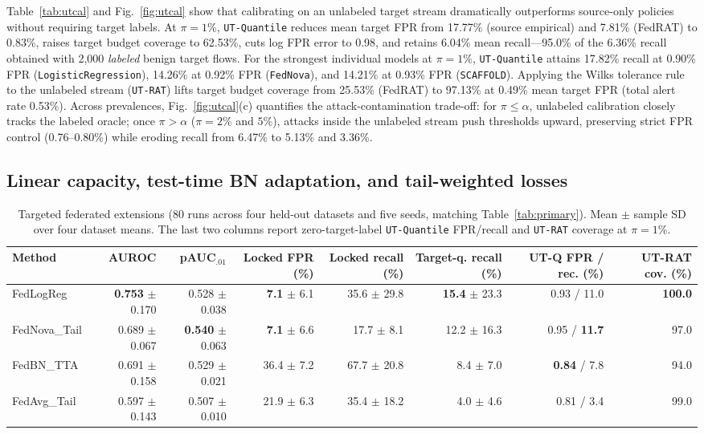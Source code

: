 \documentclass[journal,10pt]{IEEEtran}
\begin{document}
Table~\ref{tab:utcal} and Fig.~\ref{fig:utcal} show that calibrating on an unlabeled target stream dramatically outperforms source-only policies without requiring target labels. At $\pi=1\%$, \texttt{UT-Quantile} reduces mean target FPR from 17.77\% (source empirical) and 7.81\% (FedRAT) to 0.83\%, raises target budget coverage to 62.53\%, cuts log FPR error to 0.98, and retains 6.04\% mean recall---95.0\% of the 6.36\% recall obtained with 2,000 \emph{labeled} benign target flows. For the strongest individual models at $\pi=1\%$, \texttt{UT-Quantile} attains 17.82\% recall at 0.90\% FPR (\texttt{LogisticRegression}), 14.26\% at 0.92\% FPR (\texttt{FedNova}), and 14.21\% at 0.93\% FPR (\texttt{SCAFFOLD}). Applying the Wilks tolerance rule to the unlabeled stream (\texttt{UT-RAT}) lifts target budget coverage from 25.53\% (FedRAT) to 97.13\% at 0.49\% mean target FPR (total alert rate 0.53\%). Across prevalences, Fig.~\ref{fig:utcal}(c) quantifies the attack-contamination trade-off: for $\pi\le\alpha$, unlabeled calibration closely tracks the labeled oracle; once $\pi>\alpha$ ($\pi=2\%$ and $5\%$), attacks inside the unlabeled stream push thresholds upward, preserving strict FPR control (0.76--0.80\%) while eroding recall from 6.47\% to 5.13\% and 3.36\%.

\subsection{Linear capacity, test-time BN adaptation, and tail-weighted losses}
\begin{table}[t]\centering\footnotesize
\caption{Targeted federated extensions (80 runs across four held-out datasets and five seeds, matching Table~\ref{tab:primary}). Mean $\pm$ sample SD over four dataset means. The last two columns report zero-target-label \texttt{UT-Quantile} FPR/recall and \texttt{UT-RAT} coverage at $\pi=1\%$.}\label{tab:day2}
\setlength{\tabcolsep}{4pt}\begin{tabular}{lrrrrrrr}\toprule
Method & AUROC & pAUC$_{.01}$ & Locked FPR (\%) & Locked recall (\%) & Target-q. recall (\%) & UT-Q FPR / rec. (\%) & UT-RAT cov. (\%)\\\midrule
FedLogReg & \textbf{0.753} $\pm$ 0.170 & 0.528 $\pm$ 0.038 & \textbf{7.1} $\pm$ 6.1 & 35.6 $\pm$ 29.8 & \textbf{15.4} $\pm$ 23.3 & 0.93 / 11.0 & \textbf{100.0}\\
FedNova\_Tail & 0.689 $\pm$ 0.067 & \textbf{0.540} $\pm$ 0.063 & \textbf{7.1} $\pm$ 6.6 & 17.7 $\pm$ 8.1 & 12.2 $\pm$ 16.3 & 0.95 / \textbf{11.7} & 97.0\\
FedBN\_TTA & 0.691 $\pm$ 0.158 & 0.529 $\pm$ 0.021 & 36.4 $\pm$ 7.2 & 67.7 $\pm$ 20.8 & 8.4 $\pm$ 7.0 & \textbf{0.84} / 7.8 & 94.0\\
FedAvg\_Tail & 0.597 $\pm$ 0.143 & 0.507 $\pm$ 0.010 & 21.9 $\pm$ 6.3 & 35.4 $\pm$ 18.2 & 4.0 $\pm$ 4.6 & 0.81 / 3.4 & 99.0\\\bottomrule
\end{tabular}\end{table}
\end{document}
